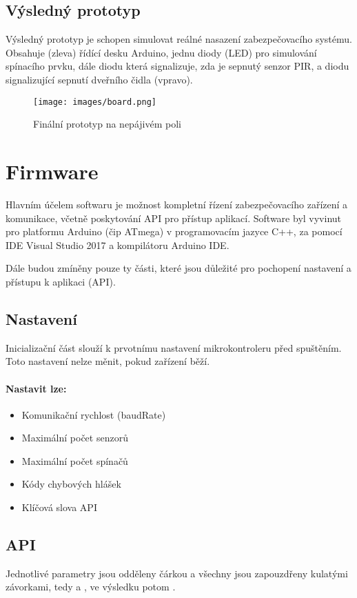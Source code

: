 \documentclass[FM,MP]{tulthesis}  %
\begin{document}
\subsection{Výsledný prototyp}
Výsledný prototyp je schopen simulovat reálné nasazení zabezpečovacího systému. Obsahuje (zleva) řídící desku Arduino, jednu diody (LED) pro simulování spínacího prvku, dále diodu která signalizuje, zda je sepnutý senzor PIR, a diodu signalizující sepnutí dveřního čidla (vpravo). 

\begin{figure}[H]
\begin{center}
\texttt{[image: images/board.png]}
\caption{Finální prototyp na nepájivém poli}
\label{image}
\end{center}
\end{figure}

\section{Firmware}
Hlavním účelem softwaru je možnost kompletní řízení zabezpečovacího zařízení a komunikace, včetně poskytování API pro přístup aplikací. Software byl vyvinut pro platformu Arduino (čip ATmega) v programovacím jazyce C++, za pomocí IDE Visual Studio 2017 a kompilátoru Arduino IDE. 

Dále budou zmíněny pouze ty části, které jsou důležité pro pochopení nastavení a přístupu k aplikaci (API).

\subsection{Nastavení}
Inicializační část slouží k prvotnímu nastavení mikrokontroleru před spuštěním. Toto nastavení nelze měnit, pokud zařízení běží.

\paragraph{Nastavit lze:}
\begin{itemize}
\item Komunikační rychlost (baudRate)
\item Maximální počet senzorů
\item Maximální počet spínačů
\item Kódy chybových hlášek
\item Klíčová slova API
\end{itemize} 

\subsection{API}
Jednotlivé parametry jsou odděleny čárkou a všechny jsou zapouzdřeny kulatými závorkami, tedy \uv{(} a \uv{)}, ve výsledku potom .
\end{document}
